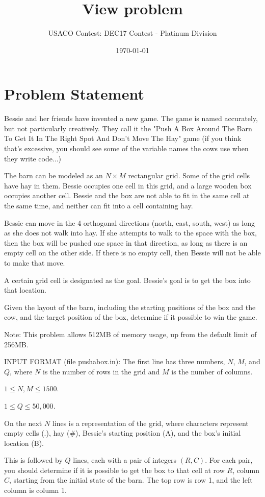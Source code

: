 \documentclass[12pt]{article}
\title{View problem}
\author{USACO Contest: DEC17 Contest - Platinum Division}
\date{\today}
\begin{document}
\maketitle

\section*{Problem Statement}

Bessie and her friends have invented a new game. The game is named accurately,
but not particularly creatively. They call it the "Push A Box Around The Barn To
Get It In The Right Spot And Don't Move The Hay" game (if you think that's
excessive, you should see some of the variable names the cows use when they
write code...)

The barn can be modeled as an $N \times M$ rectangular grid. Some of the grid
cells have hay in them. Bessie occupies one cell in this grid, and a large
wooden box occupies another cell.  Bessie and the box are not able to fit in the
same  cell at the same time, and neither can fit into a cell containing hay.

Bessie can move in the 4 orthogonal directions (north, east, south, west) as
long as she does not walk into hay. If she attempts to walk to the space with
the box, then the box will be pushed one space in that direction, as long as
there is an empty cell on the other side. If there is no empty cell, then Bessie
will not be able to make that move.

A certain grid cell is designated as the goal. Bessie's goal is to get the box
into that location.  

Given the layout of the barn, including the starting positions of the box and
the cow, and the target position of the box, determine if it possible to win the
game.

Note: This problem allows 512MB of memory usage, up from the default limit of 256MB.

INPUT FORMAT (file pushabox.in):
The first line has three numbers, $N$, $M$, and $Q$, where $N$ is the number of
rows in the grid and $M$ is the number of columns.


$1 \le N,M \le 1500$.

$1 \le Q \le 50,000$.

On the next $N$ lines is a representation of the grid, where characters
represent empty cells (.), hay (#), Bessie's starting position (A), and the
box's initial location (B).

This is followed by $Q$ lines, each with a pair of integers $(R, C)$. For each
pair, you should determine if it is possible to get the box to that cell at row
$R$, column $C$, starting from the initial state of the barn. The top row is row
1, and the left column is column 1.
\end{document}
